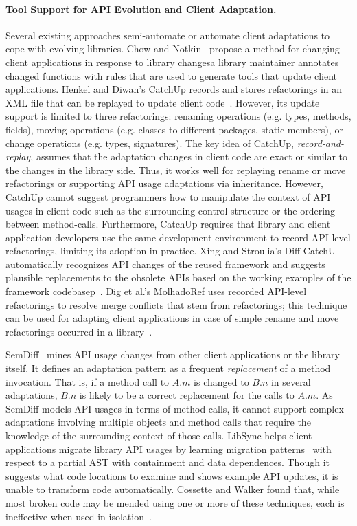 \paragraph{{Tool Support for API Evolution and Client Adaptation.}} 
Several existing approaches semi-automate or automate client adaptations to cope with evolving libraries.  Chow and Notkin~\cite{Chow1996} propose a method for changing client applications in response to library changes\textemdash a library maintainer annotates changed functions with rules that are used to generate tools that update client applications. Henkel and Diwan's CatchUp records and stores refactorings in an XML file that can be replayed to update client code~\cite{Henkel2005}. However, its update support is limited to three refactorings: renaming operations (e.g.  types, methods, fields), moving operations (e.g. classes to different packages, static members), or change operations (e.g. types, signatures). The key idea of CatchUp, {\em record-and-replay}, assumes that the adaptation changes in client code are exact or similar to the changes in the library side. Thus, it works well for replaying rename or move refactorings or supporting API usage adaptations via inheritance. However, CatchUp cannot suggest programmers how to manipulate the context of API usages in client code such as the surrounding control structure or the ordering between method-calls. Furthermore, CatchUp requires that library and client application developers use the same development environment to record API-level refactorings, limiting its adoption in practice. Xing and Stroulia's Diff-CatchU automatically recognizes API changes of the reused framework and suggests plausible replacements to the obsolete APIs based on the working examples of the framework codebasep~\cite{Xing2007:diffcatchup}. Dig et al.'s MolhadoRef uses recorded API-level refactorings to resolve merge conflicts that stem from refactorings; this technique can be used for adapting client applications in case of simple rename and move refactorings occurred in a library~\cite{Dig2007}.  

SemDiff~\cite{Dagenais2008:RAC} mines API usage changes from other client applications or the library itself.  It defines an adaptation pattern as a frequent {\em replacement} of a method invocation. That is, if a method call to $A.m$ is changed to $B.n$ in several adaptations, $B.n$ is likely to be a correct replacement for the calls to $A.m$. As SemDiff models API usages in terms of method calls, it cannot support complex adaptations involving multiple objects and method calls that require the knowledge of the surrounding context of those calls. LibSync helps client applications migrate library API usages by learning migration patterns~\cite{Nguyen2010:GAA} with respect to a partial AST with containment and data dependences. Though it suggests what code locations to examine and shows example API updates, it is {unable} to transform code automatically. Cossette and Walker found that, while most broken code may be mended using one or more of these techniques, each is ineffective when used in isolation~\cite{cossette2012}. 

